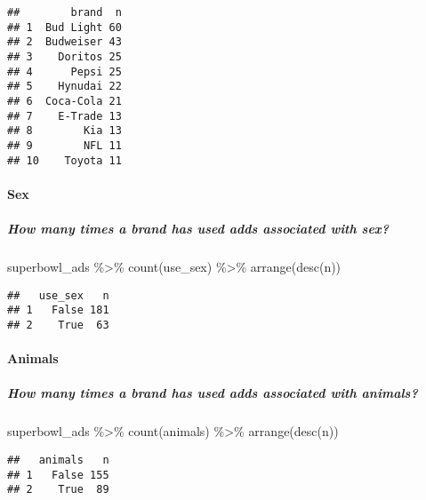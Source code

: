 \documentclass[
]{article}
\newenvironment{Shaded}{\begin{snugshade}}{\end{snugshade}}
\newcommand{\FunctionTok}[1]{\textcolor[rgb]{0.00,0.00,0.00}{#1}}
\newcommand{\NormalTok}[1]{#1}
\newcommand{\SpecialCharTok}[1]{\textcolor[rgb]{0.00,0.00,0.00}{#1}}
\begin{document}
\begin{verbatim}
##        brand  n
## 1  Bud Light 60
## 2  Budweiser 43
## 3    Doritos 25
## 4      Pepsi 25
## 5    Hynudai 22
## 6  Coca-Cola 21
## 7    E-Trade 13
## 8        Kia 13
## 9        NFL 11
## 10    Toyota 11
\end{verbatim}

\hypertarget{sex}{%
\paragraph{Sex}\label{sex}}

\hypertarget{how-many-times-a-brand-has-used-adds-associated-with-sex}{%
\subparagraph{How many times a brand has used adds associated with
sex?}\label{how-many-times-a-brand-has-used-adds-associated-with-sex}}

\begin{Shaded}
\begin{Highlighting}[]
\NormalTok{superbowl\_ads }\SpecialCharTok{\%\textgreater{}\%}
  \FunctionTok{count}\NormalTok{(use\_sex) }\SpecialCharTok{\%\textgreater{}\%}
  \FunctionTok{arrange}\NormalTok{(}\FunctionTok{desc}\NormalTok{(n))}
\end{Highlighting}
\end{Shaded}

\begin{verbatim}
##   use_sex   n
## 1   False 181
## 2    True  63
\end{verbatim}

\hypertarget{animals}{%
\paragraph{Animals}\label{animals}}

\hypertarget{how-many-times-a-brand-has-used-adds-associated-with-animals}{%
\subparagraph{How many times a brand has used adds associated with
animals?}\label{how-many-times-a-brand-has-used-adds-associated-with-animals}}

\begin{Shaded}
\begin{Highlighting}[]
\NormalTok{superbowl\_ads }\SpecialCharTok{\%\textgreater{}\%}
  \FunctionTok{count}\NormalTok{(animals) }\SpecialCharTok{\%\textgreater{}\%}
  \FunctionTok{arrange}\NormalTok{(}\FunctionTok{desc}\NormalTok{(n))}
\end{Highlighting}
\end{Shaded}

\begin{verbatim}
##   animals   n
## 1   False 155
## 2    True  89
\end{verbatim}
\end{document}
